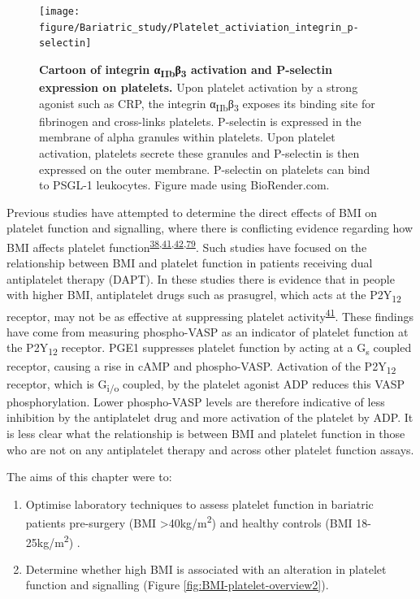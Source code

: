 \documentclass[11pt,twoside]{bristolthesis}
\providecommand{\tightlist}{%
  \setlength{\itemsep}{0pt}\setlength{\parskip}{0pt}}
\begin{document}
\begin{figure}
\texttt{[image: figure/Bariatric\_study/Platelet\_activiation\_integrin\_p-selectin]} \caption[Cartoon of integrin α\textsubscript{IIb}β\textsubscript{3} and P-selectin on platelets.]{\textbf{Cartoon of integrin α\textsubscript{IIb}β\textsubscript{3} activation and P-selectin expression on platelets.} Upon platelet activation by a strong agonist such as CRP, the integrin α\textsubscript{IIb}β\textsubscript{3} exposes its binding site for fibrinogen and cross-links platelets. P-selectin is expressed in the membrane of alpha granules within platelets. Upon platelet activation, platelets secrete these granules and P-selectin is then expressed on the outer membrane. P-selectin on platelets can bind to PSGL-1 leukocytes. Figure made using BioRender.com.}\label{fig:platelet-activation-2}
\end{figure}
Previous studies have attempted to determine the direct effects of BMI on platelet function and signalling, where there is conflicting evidence regarding how BMI affects platelet function\textsuperscript{\protect\hyperlink{ref-Nardin2015}{38},\protect\hyperlink{ref-Deharo2014}{41},\protect\hyperlink{ref-Sibbing2007}{42},\protect\hyperlink{ref-Barrachina2019}{79}}. Such studies have focused on the relationship between BMI and platelet function in patients receiving dual antiplatelet therapy (DAPT). In these studies there is evidence that in people with higher BMI, antiplatelet drugs such as prasugrel, which acts at the P2Y\textsubscript{12} receptor, may not be as effective at suppressing platelet activity\textsuperscript{\protect\hyperlink{ref-Deharo2014}{41}}. These findings have come from measuring phospho-VASP as an indicator of platelet function at the P2Y\textsubscript{12} receptor. PGE1 suppresses platelet function by acting at a G\textsubscript{s} coupled receptor, causing a rise in cAMP and phospho-VASP. Activation of the P2Y\textsubscript{12} receptor, which is G\textsubscript{i/o} coupled, by the platelet agonist ADP reduces this VASP phosphorylation. Lower phospho-VASP levels are therefore indicative of less inhibition by the antiplatelet drug and more activation of the platelet by ADP. It is less clear what the relationship is between BMI and platelet function in those who are not on any antiplatelet therapy and across other platelet function assays.

The aims of this chapter were to:
\begin{enumerate}
\def\labelenumi{\arabic{enumi})}
\tightlist
\item
  Optimise laboratory techniques to assess platelet function in bariatric patients pre-surgery (BMI \textgreater40kg/m\textsuperscript{2}) and healthy controls (BMI 18-25kg/m\textsuperscript{2}) .
\item
  Determine whether high BMI is associated with an alteration in platelet function and signalling (Figure \ref{fig:BMI-platelet-overview2}).
\end{enumerate}
\end{document}
